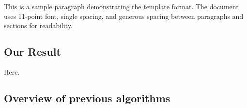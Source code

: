 This is a sample paragraph demonstrating the template format. 
The document uses 11-point font, single spacing, and generous
spacing between paragraphs and sections for readability.

\subsection{Our Result}
Here.

\subsection{Overview of previous algorithms}
